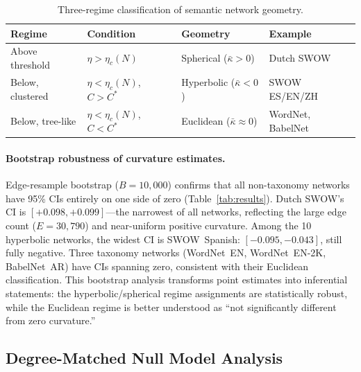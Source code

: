 \documentclass[11pt,a4paper]{article}
\newcommand{\kbar}{\bar{\kappa}}
\newcommand{\etac}{\eta_c}
\newcommand{\Cstar}{C^*}
\begin{document}
\begin{table}[t]
\centering
\caption{Three-regime classification of semantic network geometry.}
\label{tab:regimes}
\begin{tabular}{@{}llll@{}}
\toprule
Regime & Condition & Geometry & Example \\
\midrule
Above threshold & $\eta > \etac(N)$ & Spherical ($\kbar > 0$) & Dutch SWOW \\
Below, clustered & $\eta < \etac(N)$, $C > \Cstar$ & Hyperbolic ($\kbar < 0$) & SWOW ES/EN/ZH \\
Below, tree-like & $\eta < \etac(N)$, $C < \Cstar$ & Euclidean ($\kbar \approx 0$) & WordNet, BabelNet \\
\bottomrule
\end{tabular}
\end{table}

\paragraph{Bootstrap robustness of curvature estimates.}
Edge-resample bootstrap ($B = 10{,}000$) confirms that all non-taxonomy networks have 95\% CIs entirely on one side of zero (Table~\ref{tab:results}). Dutch SWOW's CI is $[+0.098, +0.099]$---the narrowest of all networks, reflecting the large edge count ($E = 30{,}790$) and near-uniform positive curvature. Among the 10 hyperbolic networks, the widest CI is SWOW~Spanish: $[-0.095, -0.043]$, still fully negative. Three taxonomy networks (WordNet~EN, WordNet~EN-2K, BabelNet~AR) have CIs spanning zero, consistent with their Euclidean classification. This bootstrap analysis transforms point estimates into inferential statements: the hyperbolic/spherical regime assignments are statistically robust, while the Euclidean regime is better understood as ``not significantly different from zero curvature.''

\subsection{Degree-Matched Null Model Analysis}
\end{document}
